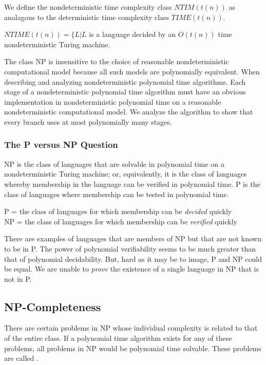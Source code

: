 \documentclass{article}
\begin{document}
We define the nondeterministic time complexity class $NTIM(t(n))$ as analagous to the deterministic time complexity class $TIME(t(n))$. 

\begin{definition}
  $NTIME(t(n)) = \{L|L$ is a language decided by an $O(t(n))$ time nondeterministic Turing machine. 
\end{definition}

The class NP is insensitive to the choice of reasonable nondeterministic computational model because all such models are polynomially equivalent. When describing and analyzing nondeterministic polynomial time algorithms. Each stage of a nondeterministic polynomial time algorithm must have an obvious implementation in nondeterministic polynomial time on a reasonable nondeterministic computational model. We analyze the algorithm to show that every branch uses at most polynomially many stages. 

\subsubsection{The P versus NP Question}

NP is the class of languages that are solvable in polynomial time on a nondeterministic Turing machine; or, equivalently, it is the class of languages whereby membership in the language can be verified in polynomial time. P is the class of languages where membership can be tested in polynomial time. 
\begin{center}
  P = the class of languages for which membership can be \emph{decided} quickly \\ 
  NP = the class of languages for which membership can be \emph{verified} quickly
\end{center}
There are examples of languages that are members of NP but that are not known to be in P. The power of polynomial verifiability seems to be much greater than that of polynomial decidability. But, hard as it may be to image, P and NP could be equal. We are unable to \emph{prove} the existence of a single language in NP that is not in P. 

\subsection{NP-Completeness}

There are certain problems in NP whose individual complexity is related to that of the entire class. If a polynomial time algorithm exists for any of these problems, all problems in NP would be polynomial time solvable. These problems are called . 
\end{document}
